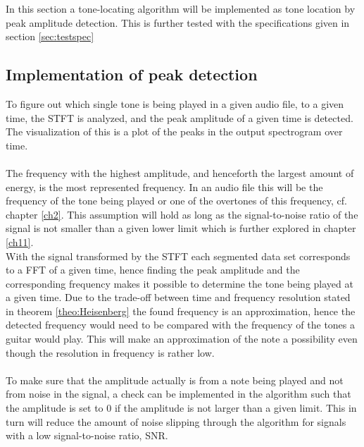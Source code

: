 \label{sec:peak_detection}
In this section a tone-locating algorithm will be implemented as tone location by peak amplitude detection.
This is further tested with the specifications given in section \ref{sec:testspec}
\subsection{Implementation of peak detection}
To figure out which single tone is being played in a given audio file, to a given time, the STFT is analyzed, and the peak amplitude of a given time is detected.
The visualization of this is a plot of the peaks in the output spectrogram over time.\\
\\
The frequency with the highest amplitude, and henceforth the largest amount of energy, is the most represented frequency. 
In an audio file this will be the frequency of the tone being played or one of the overtones of this frequency, cf. chapter \ref{ch2}.
This assumption will hold as long as the signal-to-noise ratio of the signal is not smaller than a given lower limit which is further explored in chapter \ref{ch11}.\\
With the signal transformed by the STFT each segmented data set corresponds to a FFT of a given time, hence finding the peak amplitude and the corresponding frequency makes it possible to determine the tone being played at a given time. Due to the trade-off between time and frequency resolution stated in theorem \ref{theo:Heisenberg} the found frequency is an approximation, hence the detected frequency would need to be compared with the frequency of the tones a guitar would play. 
This will make an approximation of the note a possibility even though the resolution in frequency is rather low. \\
\\
To make sure that the amplitude actually is from a note being played and not from noise in the signal, a check can be implemented in the algorithm such that the amplitude is set to $0$ if the amplitude is not larger than a given limit.
This in turn will reduce the amount of noise slipping through the algorithm for signals with a low signal-to-noise ratio, SNR.

